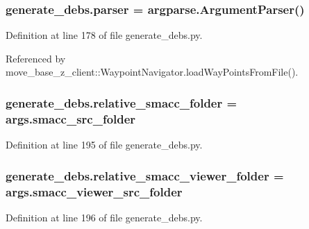 \subsubsection[{\texorpdfstring{parser}{parser}}]{\setlength{\rightskip}{0pt plus 5cm}generate\+\_\+debs.\+parser = argparse.\+Argument\+Parser()}\hypertarget{namespacegenerate__debs_a4a9ae4bb85fc62d7973ea3d09ced6c26}{}\label{namespacegenerate__debs_a4a9ae4bb85fc62d7973ea3d09ced6c26}


Definition at line 178 of file generate\+\_\+debs.\+py.



Referenced by move\+\_\+base\+\_\+z\+\_\+client\+::\+Waypoint\+Navigator.\+load\+Way\+Points\+From\+File().

\subsubsection[{\texorpdfstring{relative\+\_\+smacc\+\_\+folder}{relative_smacc_folder}}]{\setlength{\rightskip}{0pt plus 5cm}generate\+\_\+debs.\+relative\+\_\+smacc\+\_\+folder = args.\+smacc\+\_\+src\+\_\+folder}\hypertarget{namespacegenerate__debs_abf6925bd06ac1da3981fe638eefb5a61}{}\label{namespacegenerate__debs_abf6925bd06ac1da3981fe638eefb5a61}


Definition at line 195 of file generate\+\_\+debs.\+py.

\subsubsection[{\texorpdfstring{relative\+\_\+smacc\+\_\+viewer\+\_\+folder}{relative_smacc_viewer_folder}}]{\setlength{\rightskip}{0pt plus 5cm}generate\+\_\+debs.\+relative\+\_\+smacc\+\_\+viewer\+\_\+folder = args.\+smacc\+\_\+viewer\+\_\+src\+\_\+folder}\hypertarget{namespacegenerate__debs_a22d892b78adfce583710d78737eb4747}{}\label{namespacegenerate__debs_a22d892b78adfce583710d78737eb4747}


Definition at line 196 of file generate\+\_\+debs.\+py.


